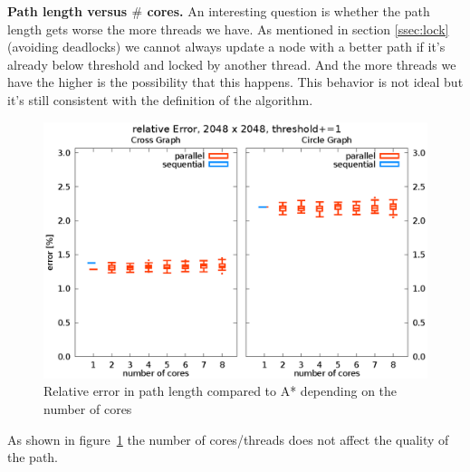 \documentclass[letterpaper]{article}
\newcommand{\mypar}[1]{{\bf #1.}}
\begin{document}
\mypar{Path length versus $\#$ cores}
An interesting question is whether the path length gets worse the more threads we have. As mentioned in section \ref{ssec:lock} (avoiding deadlocks) we cannot always update a node with a better path if it's already below threshold and locked by another thread. And the more threads we have the higher is the possibility that this happens. This behavior is not ideal but it's still consistent with the definition of the algorithm.
\begin{figure}[h]\centering
  \includegraphics[scale=0.558]{error_cores.eps}
  \caption{Relative error in path length compared to A* depending on the number of cores\label{fig:error_cores}}
\end{figure}
As shown in figure~\ref{fig:error_cores} the number of cores/threads does not affect the quality of the path.
\end{document}

